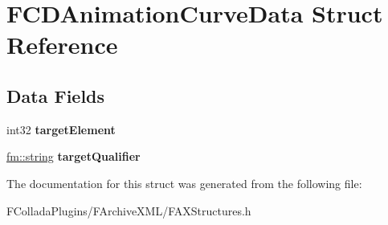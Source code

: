 \hypertarget{structFCDAnimationCurveData}{
\section{FCDAnimationCurveData Struct Reference}
\label{structFCDAnimationCurveData}
}
\subsection*{Data Fields}
\begin{DoxyCompactItemize}
\item 
\hypertarget{structFCDAnimationCurveData_a57a1100f4df2dff9c49b246473f0e971}{
int32 {\bfseries targetElement}}
\label{structFCDAnimationCurveData_a57a1100f4df2dff9c49b246473f0e971}

\item 
\hypertarget{structFCDAnimationCurveData_aedf498a272d5a310c68771b844375a6b}{
\hyperlink{classfm_1_1stringT}{fm::string} {\bfseries targetQualifier}}
\label{structFCDAnimationCurveData_aedf498a272d5a310c68771b844375a6b}

\end{DoxyCompactItemize}


The documentation for this struct was generated from the following file:\begin{DoxyCompactItemize}
\item 
FColladaPlugins/FArchiveXML/FAXStructures.h\end{DoxyCompactItemize}
